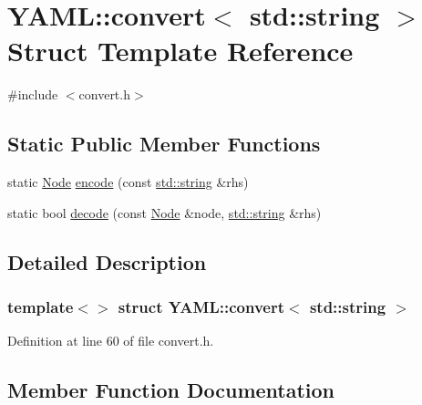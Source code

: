 \hypertarget{struct_y_a_m_l_1_1convert_3_01std_1_1string_01_4}{}\section{Y\+A\+ML\+::convert$<$ std\+::string $>$ Struct Template Reference}
\label{struct_y_a_m_l_1_1convert_3_01std_1_1string_01_4}


{\ttfamily \#include $<$convert.\+h$>$}

\subsection*{Static Public Member Functions}
\begin{DoxyCompactItemize}
\item 
static \mbox{\hyperlink{class_y_a_m_l_1_1_node}{Node}} \mbox{\hyperlink{struct_y_a_m_l_1_1convert_3_01std_1_1string_01_4_aa0d976f9df2bb843d7ac7bcda30ac4c3}{encode}} (const \mbox{\hyperlink{glad_8h_ac83513893df92266f79a515488701770}{std\+::string}} \&rhs)
\item 
static bool \mbox{\hyperlink{struct_y_a_m_l_1_1convert_3_01std_1_1string_01_4_ab1fea94c3b510057d0a452420e82cb82}{decode}} (const \mbox{\hyperlink{class_y_a_m_l_1_1_node}{Node}} \&node, \mbox{\hyperlink{glad_8h_ac83513893df92266f79a515488701770}{std\+::string}} \&rhs)
\end{DoxyCompactItemize}


\subsection{Detailed Description}
\subsubsection*{template$<$$>$\newline
struct Y\+A\+M\+L\+::convert$<$ std\+::string $>$}



Definition at line 60 of file convert.\+h.



\subsection{Member Function Documentation}
\mbox{\label{struct_y_a_m_l_1_1convert_3_01std_1_1string_01_4_ab1fea94c3b510057d0a452420e82cb82}} 
